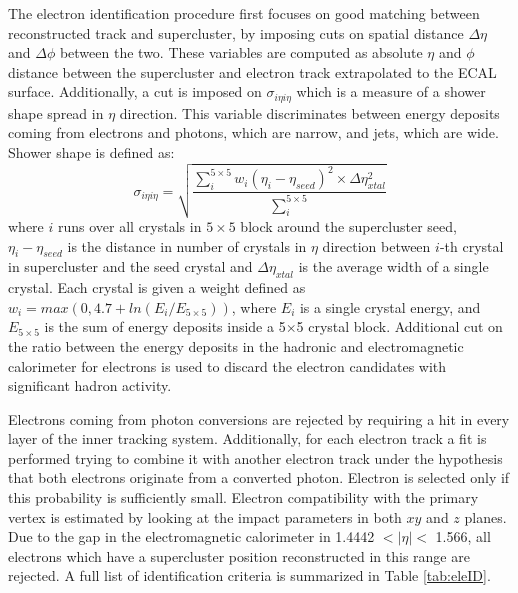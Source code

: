 The electron identification procedure first focuses on good matching between reconstructed track and supercluster, by imposing cuts on spatial distance $\Delta \eta$ and $\Delta \phi$ between the two. These variables are computed as absolute $\eta$ and $\phi$ distance between the supercluster and electron track extrapolated to the ECAL surface. Additionally, a cut is imposed on $\sigma_{i\eta i\eta}$ which is a measure of a shower shape spread in $\eta$ direction. This variable discriminates between energy deposits coming from electrons and photons, which are narrow, and jets, which are wide. Shower shape is defined as:
\begin{equation}
\sigma_{i\eta i\eta} = \sqrt{\frac{\sum_{i}^{5\times 5} w_i(\eta_i-\eta_{seed})^2\times \Delta \eta^2_{xtal} }{\sum_{i}^{5\times 5}}}
\end{equation}
where $i$ runs over all crystals in $5\times5$ block around the supercluster seed, $\eta_i-\eta_{seed}$ is the distance in number of crystals in $\eta$ direction between $i$-th crystal in supercluster and the seed crystal and $\Delta \eta_{xtal}$ is the average width of a single crystal. Each crystal is given a weight defined as $w_i=max(0,4.7+ln(E_i/E_{5\times5}))$, where $E_i$ is a single crystal energy, and $E_{5\times 5}$ is the sum of energy deposits inside a 5$\times$5 crystal block. 
Additional cut on the ratio between the energy deposits in the hadronic and electromagnetic calorimeter for electrons is used to discard the electron candidates with significant hadron activity.
\par Electrons coming from photon conversions are rejected by requiring a hit in every layer of the inner tracking system. Additionally, for each electron track a fit is performed trying to combine it with another electron track under the hypothesis that both electrons originate from a converted photon. Electron is selected only if this probability is sufficiently small. Electron compatibility with the primary vertex is estimated by looking at the impact parameters in both $xy$ and $z$ planes. Due to the gap in the electromagnetic calorimeter in 1.4442 $< |\eta| <$ 1.566, all electrons which have a supercluster position reconstructed in this range are rejected. A full list of identification criteria is summarized in Table \ref{tab:eleID}.
